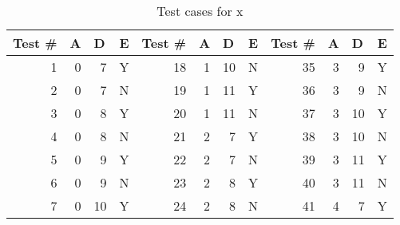 \documentclass[12pt, letterpaper, titlepage]{article}
\begin{document}
\begin{table}[H]
    \centering
    \caption{Test cases for x}
    \begin{tabular}{|r|r|r|l|r|r|r|l|r|r|r|l|}
    \hline
    \multicolumn{1}{|l|}{Test \#} & \multicolumn{1}{l|}{A} & \multicolumn{1}{l|}{D} & E & \multicolumn{1}{l|}{Test \#} & \multicolumn{1}{l|}{A} & \multicolumn{1}{l|}{D} & E & \multicolumn{1}{l|}{Test \#} & \multicolumn{1}{l|}{A} & \multicolumn{1}{l|}{D} & E \\ \hline
    1                             & 0                      & 7                      & Y & 18                           & 1                      & 10                     & N & 35                           & 3                      & 9                      & Y \\ \hline
    2                             & 0                      & 7                      & N & 19                           & 1                      & 11                     & Y & 36                           & 3                      & 9                      & N \\ \hline
    3                             & 0                      & 8                      & Y & 20                           & 1                      & 11                     & N & 37                           & 3                      & 10                     & Y \\ \hline
    4                             & 0                      & 8                      & N & 21                           & 2                      & 7                      & Y & 38                           & 3                      & 10                     & N \\ \hline
    5                             & 0                      & 9                      & Y & 22                           & 2                      & 7                      & N & 39                           & 3                      & 11                     & Y \\ \hline
    6                             & 0                      & 9                      & N & 23                           & 2                      & 8                      & Y & 40                           & 3                      & 11                     & N \\ \hline
    7                             & 0                      & 10                     & Y & 24                           & 2                      & 8                      & N & 41                           & 4                      & 7                      & Y \\ \hline

\end{tabular}
\end{table}
\end{document}

